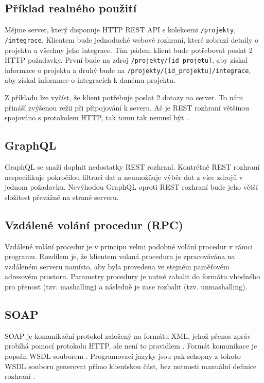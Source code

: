 \subsection{Příklad realného použití}

Mějme server, který disponuje HTTP REST API s kolekcemi \verb|/projekty|, \verb|/integrace|.
Klientem bude jednoduché webové rozhraní, které zobrazí detaily o projektu a všechny jeho integrace.
Tím pádem klient bude potřebovat poslat 2 HTTP požadavky.
První bude na zdroj \verb|/projekty/[id_projetu]|, aby získal informace o projektu a druhý bude na \verb|/projekty/[id_projektu]/integrace|, aby získal informace o integracích k danému projektu.

Z příkladu lze vyčíst, že klient potřebuje poslat 2 dotazy na server.
To nám přináší zvýšenou režii při připojování k severu.
Ač je REST rozhraní většinou spojováno s protokolem HTTP, tak tomu tak nemusí být \cite{rest_http}.

\subsection{GraphQL}

GraphQL se snaží doplnit nedostatky REST rozhraní.
Kontrétně REST rozhraní nespecifikuje pokročilou filtraci dat a neumožňuje výběr dat z více zdrojů v jednom požadavku.
Nevýhodou GraphQL oproti REST rozhraní bude jeho větší složitost převážně na straně serveru.
\cite{graphql}

\subsection{Vzdálené volání procedur (RPC)}

Vzdálené volání procedur je v principu velmi podobné volání procedur v rámci programu.
Rozdílem je, že klientem volaná procedura je zpracovávána na vzdáleném serveru namísto, aby byla provedena ve stejném paměťovém adresovém prostoru.
Parametry procedury je nutné zabalit do formátu vhodného pro přenost (tzv. mashalling) a následně je zase rozbalit (tzv. unmashalling).
\cite{rpc}

\subsection{SOAP}

SOAP je komunikační protokol založený na formátu XML, jehož přenos zpráv probíhá pomocí protokolu HTTP, ale není to pravidlem \cite{soap}.
Formát komunikace je popsán WSDL souborem \cite{wsdl}.
Programovací jazyky jsou pak schopny z tohoto WSDL souboru generovat přímo klientskou část, bez nutnosti manuální definice rozhraní \cite{php_wsdl}.

